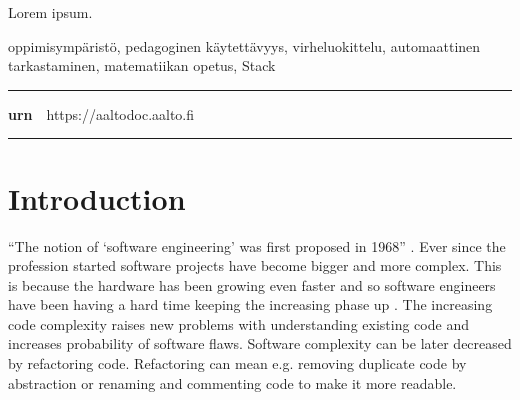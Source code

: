 \begin{spacing}{1.05}

\vspace{.8mm}

{\small
  Lorem ipsum.
}

\vfill

\end{spacing}
\begin{spacing}{.88}
{\parindent0pt %

\parbox[t]{121.6mm}{\raggedright\small oppimisympäristö, pedagoginen käytettävyys, virheluokittelu, automaattinen tarkastaminen, matematiikan opetus, Stack}

\vspace{.5mm}\rule{\textwidth}{.75pt}

{\fontsize{10.5pt}{10.5pt}\bfseries\sffamily\lsstyle urn}~~{\small https://aaltodoc.aalto.fi}

\vspace{-2.4mm}\rule{\textwidth}{.75pt}

} %
\end{spacing}

\restoregeometry  %




\newpage

\tableofcontents


\newpage


\chapter{Introduction}

“The notion of ‘software engineering’ was first proposed in 1968” \cite{sommerville2011software}. Ever since the profession started software projects have become bigger and more complex. This is because the hardware has been growing even faster and so software engineers have been having a hard time keeping the increasing phase up \cite{brooks1987no}. The increasing code complexity raises new problems with understanding existing code and increases probability of software flaws. Software complexity can be later decreased by refactoring code. Refactoring can mean e.g. removing duplicate code by abstraction or renaming and commenting code to make it more readable.

